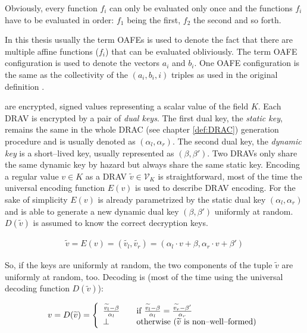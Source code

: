 \noindent{}Obviously, every function $f_i$ can only be evaluated only once and
the functions $f_i$ have to be evaluated in order: $f_1$ being the first, $f_2$
the second and so forth.

In this thesis usually the term OAFEs is used to denote the fact that there are
multiple affine functions ($f_i$) that can be evaluated obliviously. The term
OAFE configuration is used to denote the vectors $a_i$ and $b_i$. One OAFE
configuration is the same as the collectivity of the $(a_i, b_i, i)$ triples as
used in the original definition \cite{davidgoliath}.


%
%
\label{sec:drav}

 are encrypted, signed values
representing a scalar value of the field $K$. Each DRAV is encrypted by a pair
of \emph{dual keys}. The first dual key, the \emph{static key}, remains the same
in the whole DRAC (see chapter \ref{def:DRAC}) generation procedure and is
usually denoted as $(\alpha_l, \alpha_r)$. The second dual key, the
\emph{dynamic key} is a short--lived key, usually represented as $(\beta,
\beta')$. Two DRAVs only share the same dynamic key by hazard but always share
the same static key. Encoding a regular value $v \in K$ as a DRAV
$\widetilde{v} \in \mathcal{V}_K$ is straightforward, most of the time the
universal encoding function $E(v)$ is used to describe DRAV encoding. For the
sake of simplicity $E(v)$ is already parametrized by the static dual key
$(\alpha_l, \alpha_r)$ and is able to generate a new dynamic dual key $(\beta,
\beta')$ uniformly at random. $D(\widetilde{v})$ is assumed to know the correct
decryption keys.

\begin{align*}
  \widetilde{v} = E(v) = (\widetilde{v_l}, \widetilde{v_r}) =
    (\alpha_l \cdot v + \beta, \alpha_r \cdot v + \beta')
\end{align*}

\noindent{}So, if the keys are uniformly at random, the two components of the
tuple $\widetilde{v}$ are uniformly at random, too. Decoding is (most of the
time using the universal decoding function $D(\widetilde{v})$):

\begin{align*}
  v = D(\widetilde{v}) =
  \left\{
    \begin{array}{l l}
      \frac{\widetilde{v_l} - \beta}{\alpha_l} & \quad
      \text{if}~\frac{\widetilde{v_l} - \beta}{\alpha_l} =
      \frac{\widetilde{v_r} - \beta'}{\alpha_r}\\
      \bot & \quad \text{otherwise ($\widetilde{v}$ is non--well--formed)}\\
    \end{array}\right.
\end{align*}


